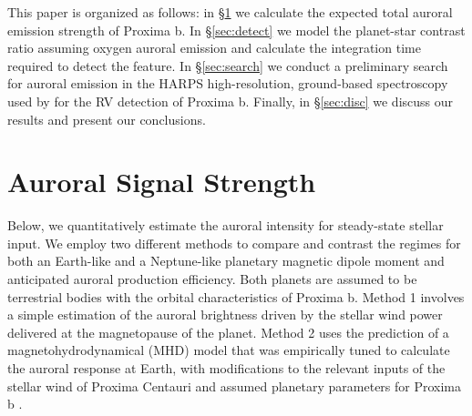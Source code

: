 \documentclass[apjl]{emulateapj}
\begin{document}
This paper is organized as follows: in \S\ref{sec:signal} we calculate the expected total auroral emission strength of Proxima b. In \S\ref{sec:detect} we model the planet-star contrast ratio assuming oxygen auroral emission and calculate the integration time required to detect the feature. In \S\ref{sec:search} we conduct a preliminary search for auroral emission in the HARPS high-resolution, ground-based spectroscopy used by \citet{Anglada-Escude2016} for the RV detection of Proxima b. Finally, in \S\ref{sec:disc} we discuss our results and present our conclusions.

%
%
%


\section{Auroral Signal Strength}
\label{sec:signal}

Below, we quantitatively estimate the auroral intensity for steady-state stellar input. We employ two different methods to compare and contrast the regimes for both an Earth-like and a Neptune-like planetary magnetic dipole moment and anticipated auroral production efficiency. Both planets are assumed to be terrestrial bodies with the orbital characteristics of Proxima b. Method 1 involves a simple estimation of the auroral brightness driven by the stellar wind power delivered at the magnetopause of the planet. Method 2 uses the prediction of a magnetohydrodynamical (MHD) model that was empirically tuned to calculate the auroral response at Earth, with modifications to the relevant inputs of the stellar wind of Proxima Centauri and assumed planetary parameters for Proxima b \citep{Anglada-Escude2016}. 
\end{document}
